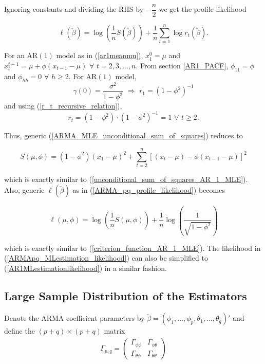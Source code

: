\documentclass[11pt, a4paper]{article}
\numberwithin{equation}{section}
\theoremstyle{definition}
\begin{document}
Ignoring constants and dividing the RHS by $-\dfrac{n}{2}$ we get the profile likelihood

\begin{equation} \label{ARMA_pq_profile_likelihood}
\ell (\utilde{\beta}) = \log \left( \dfrac{1}{n} S(\utilde{\beta}) \right) + \dfrac{1}{n} \sum \limits_{t = 1}^{n} \log r_t(\utilde{\beta}).
\end{equation}

\fcDolphin[scale = 0.8, draw = dolphin_sky, line width = 1.5] For an AR$(1)$ model as in (\ref{ar1meanmu}), $x_1^0 = \mu$ and $x_t^{t-1} = \mu + \phi(x_{t-1} - \mu)$ $\forall$ $t = 2, 3, \ldots, n$. From section \ref{AR1_PACF}, $\phi_{11} = \phi$ and $\phi_{hh} = 0$ $\forall$ $h \geq 2$. For AR$(1)$ model, 
$$\gamma (0) = \dfrac{\sigma^2}{1 - \phi^2} \,\, \Rightarrow \,\, r_1 = (1 - \phi^2)^{-1}$$ 
and using (\ref{r_t_recursive_relation}), 
$$r_t = (1 - \phi^2) \cdot (1 - \phi^2)^{-1} = 1 \,\, \forall \,\, t \geq 2.$$

Thus, generic (\ref{ARMA_MLE_unconditional_sum_of_squares}) reduces to

$$S(\mu, \phi) = (1 - \phi^2) (x_1 - \mu)^2 + \sum \limits_{t = 2}^{n} \left[ (x_t - \mu) - \phi (x_{t-1} - \mu) \right]^2$$

which is exactly similar to (\ref{unconditional_sum_of_squares_AR_1_MLE}). Also, generic $\ell (\utilde{\beta})$ as in (\ref{ARMA_pq_profile_likelihood}) becomes

$$\ell (\mu, \phi) = \log \left( \dfrac{1}{n} S(\mu, \phi) \right) + \dfrac{1}{n} \log \left( \dfrac{1}{\sqrt{1 - \phi^2}} \right)$$

which is exactly similar to (\ref{criterion_function_AR_1_MLE}). The likelihood in (\ref{ARMApq_MLestimation_likelihood}) can also be simplified to (\ref{AR1MLestimationlikelihood}) in a similar fashion.

\subsection{Large Sample Distribution of the Estimators}

Denote the ARMA coefficient parameters by $\utilde{\beta} = (\phi_1, \ldots, \phi_p, \theta_1, \ldots, \theta_q)'$ and define the $(p+q)\times (p+q)$ matrix
\begin{gather}
\Gamma_{p,q} = 
\begin{pmatrix}
\Gamma_{\phi\phi} & \Gamma_{\phi\theta} \\
\Gamma_{\theta\phi} & \Gamma_{\theta\theta}
\end{pmatrix}
\end{gather}
\end{document}
